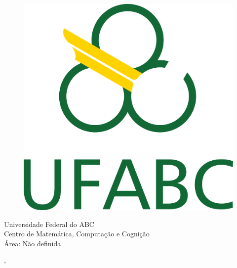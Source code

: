   \begin{capa}%
    \begin{figure}[h!]%
        \centering%
        \includegraphics[scale=1.2]{figs/logo.png}%
      \end{figure}%
    \center
	\ABNTEXchapterfont\large{Universidade Federal do ABC \\ 
  Centro de Matemática, Computação e Cognição\\ 
  Área: Não definida}

    \vfill
    \ABNTEXchapterfont\bfseries\LARGE\imprimirtitulo
    \vfill

	\ABNTEXchapterfont\large\imprimirautor
	\vfill
%
	
    \large\imprimirlocal, \large\imprimirdata

    \vspace*{1cm}
  \end{capa}
